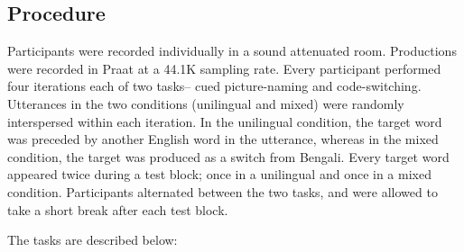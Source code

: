 \documentclass[charis,linguex]{glossa}
\begin{document}
\subsection{Procedure}
Participants were recorded individually in a sound attenuated room. %
Productions were recorded in Praat \citep{boersma2016praat} at a 44.1K sampling rate. Every participant performed four iterations each of two tasks-- cued picture-naming and code-switching. Utterances in the two conditions (unilingual and mixed) were randomly interspersed within each iteration. In the unilingual condition, the target word was preceded by another English word in the utterance, whereas in the mixed condition, the target was produced as a switch from Bengali. Every target word appeared twice during a test block; once in a unilingual and once in a mixed condition. Participants alternated between the two tasks, and were allowed to take a short break after each test block.

The tasks are described below:
\end{document}
